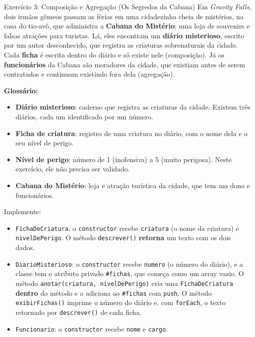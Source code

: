 \begin{exercicio}{Exercício 3: Composição e Agregação (Os Segredos da Cabana)}
Em \textit{Gravity Falls}, dois irmãos gêmeos passam as férias em uma cidadezinha cheia de
mistérios, na casa do tio-avô, que administra a \textbf{Cabana do Mistério}: uma loja de
souvenirs e falsas atrações para turistas. Lá, eles encontram um \textbf{diário misterioso},
escrito por um autor desconhecido, que registra as criaturas sobrenaturais da cidade. Cada
\textbf{ficha} é escrita dentro do diário e só existe nele (composição). Já os
\textbf{funcionários} da Cabana são moradores da cidade, que existiam antes de serem contratados
e continuam existindo fora dela (agregação).

\textbf{Glossário:}
\begin{itemize}
    \item \textbf{Diário misterioso}: caderno que registra as criaturas da cidade. Existem três
    diários, cada um identificado por um número.
    \item \textbf{Ficha de criatura}: registro de uma criatura no diário, com o nome dela e o seu
    nível de perigo.
    \item \textbf{Nível de perigo}: número de 1 (inofensiva) a 5 (muito perigosa). Neste
    exercício, ele não precisa ser validado.
    \item \textbf{Cabana do Mistério}: loja e atração turística da cidade, que tem um dono e
    funcionários.
\end{itemize}

Implemente:

\begin{itemize}
    \item \texttt{FichaDeCriatura}: o \texttt{constructor} recebe \texttt{criatura} (o nome da
    criatura) e \texttt{nivelDePerigo}. O método \texttt{descrever()} \textbf{retorna} um texto
    com os dois dados.

    \item \texttt{DiarioMisterioso}: o \texttt{constructor} recebe \texttt{numero} (o número do
    diário), e a classe tem o atributo privado \texttt{\#fichas}, que começa como um array
    vazio. O método \texttt{anotar(criatura, nivelDePerigo)} cria uma
    \texttt{FichaDeCriatura} \textbf{dentro} do método e a adiciona ao \texttt{\#fichas} com
    \texttt{push}. O método \texttt{exibirFichas()} imprime o número do diário e, com
    \texttt{forEach}, o texto retornado por \texttt{descrever()} de cada ficha.

    \item \texttt{Funcionario}: o \texttt{constructor} recebe \texttt{nome} e \texttt{cargo}.


\end{itemize}
\end{exercicio}
